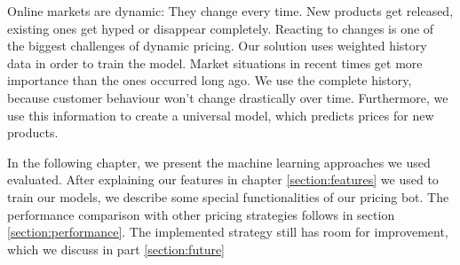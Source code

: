 Online markets are dynamic: They change every time. New products get released, existing ones get hyped or disappear completely. Reacting to changes is one of the biggest challenges of dynamic pricing. Our solution uses weighted history data in order to train the model. Market situations in recent times get more importance than the ones occurred long ago. We use the complete history, because customer behaviour won't change drastically over time. Furthermore, we use this information to create a universal model, which predicts prices for new products.

In the following chapter, we present the machine learning approaches we used evaluated. After explaining our features in chapter \ref{section:features} we used to train our models, we describe some special functionalities of our pricing bot. The performance comparison with other pricing strategies follows in section \ref{section:performance}. The implemented strategy still has room for improvement, which we discuss in part \ref{section:future}

